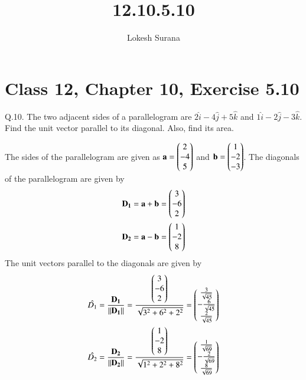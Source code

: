 \documentclass[journal,12pt,twocolumn]{IEEEtran}
\renewcommand{\vec}[1]{\boldsymbol{\mathbf{#1}}}
\begin{document}
\vspace{3cm}
\title{12.10.5.10}
\author{Lokesh Surana}
\maketitle
\section*{Class 12, Chapter 10, Exercise 5.10}

Q.10. The two adjacent sides of a parallelogram are  ${2}\hat{i} -  {4}\hat{j} + {5}\hat{k}$ and ${1}\hat{i} -  {2}\hat{j} - {3}\hat{k}$.
Find the unit vector parallel to its diagonal. Also, find its area.

\solution The sides of the parallelogram are given as $\vec{a} = \myvec{2\\-4\\5}$ and $\vec{b} = \myvec{1\\-2\\-3}$.
\break
The diagonals of the parallelogram are given by
\begin{align}
    \vec{D_1} = \vec{a} + \vec{b} = \myvec{3 \\-6\\2} \\
    \vec{D_2} = \vec{a} - \vec{b} = \myvec{1 \\-2\\8}
\end{align}
The unit vectors parallel to the diagonals are given by
\begin{align}
    \hat{D_1} = \frac{\vec{D_1}}{\norm{\vec{D_1}}} = \frac{\myvec{3 \\-6\\2}}{\sqrt{3^2 + 6^2 + 2^2}} = \myvec{\frac{3}{\sqrt{45}}\\-\frac{6}{\sqrt{45}}\\\frac{2}{\sqrt{45}}} \\
    \hat{D_2} = \frac{\vec{D_2}}{\norm{\vec{D_2}}} = \frac{\myvec{1 \\-2\\8}}{\sqrt{1^2 + 2^2 + 8^2}} = \myvec{\frac{1}{\sqrt{69}}\\-\frac{2}{\sqrt{69}}\\\frac{8}{\sqrt{69}}}
\end{align}
\end{document}

